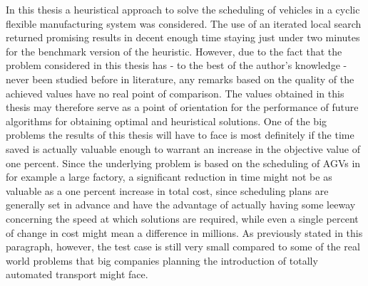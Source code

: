 In this thesis a heuristical approach to solve the scheduling of vehicles in a cyclic flexible manufacturing system was considered. The use of an iterated local search returned promising results in decent enough time staying just under two minutes for the benchmark version of the heuristic. However, due to the fact that the problem considered in this thesis has - to the best of the author's knowledge - never been studied before in literature, any remarks based on the quality of the achieved values have no real point of comparison. The values obtained in this thesis may therefore serve as a point of orientation for the performance of future algorithms for obtaining optimal and heuristical solutions. One of the big problems the results of this thesis will have to face is most definitely if the time saved is actually valuable enough to warrant an increase in the objective value of one percent. Since the underlying problem is based on the scheduling of AGVs in for example a large factory, a significant reduction in time might not be as valuable as a one percent increase in total cost, since scheduling plans are generally set in advance and have the advantage of actually having some leeway concerning the speed at which solutions are required, while even a single percent of change in cost might mean a difference in millions. As previously stated in this paragraph, however, the test case is still very small compared to some of the real world problems that big companies planning the introduction of totally automated transport might face.